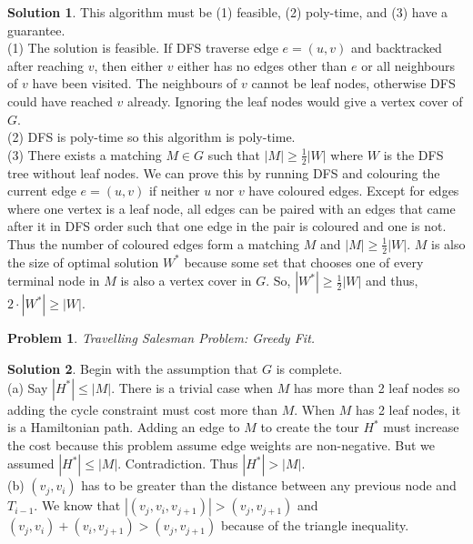 \documentclass{article}
\newtheorem{problem}{Problem}
\theoremstyle{definition}
\newtheorem*{solution}{Solution}
\begin{document}
\begin{solution}

This algorithm must be (1) feasible, (2) poly-time, and (3) have a guarantee. \\

(1) The solution is feasible. If DFS traverse edge \(e=(u,v)\) and backtracked after reaching \(v\), then either \(v\) either has no edges other than \(e\) or all neighbours of \(v\) have been visited. The neighbours of \(v\) cannot be leaf nodes, otherwise DFS could have reached \(v\) already. Ignoring the leaf nodes would give a vertex cover of \(G\). \\

(2) DFS is poly-time so this algorithm is poly-time. \\

(3) There exists a matching \(M\in G\) such that \(|M|\geq \frac{1}{2} |W|\) where \(W\) is the DFS tree without leaf nodes. We can prove this by running DFS and colouring the current edge \(e=(u,v)\) if neither \(u\) nor \(v\) have coloured edges. Except for edges where one vertex is a leaf node, all edges can be paired with an edges that came after it in DFS order such that one edge in the pair is coloured and one is not. Thus the number of coloured edges form a matching \(M\) and \(|M|\geq \frac{1}{2}|W|\). \(M\) is also the size of optimal solution \(W^*\) because some set that chooses one of every terminal node in \(M\) is also a vertex cover in \(G\). So, \(|W^*|\geq \frac{1}{2} |W|\) and thus, \(2\cdot |W^*|\geq |W|\).

\end{solution}

\begin{problem} 

Travelling Salesman Problem: Greedy Fit.

\end{problem}

\begin{solution} Begin with the assumption that \(G\) is complete. \\

(a) Say \(|H^*|\leq |M|\). There is a trivial case when \(M\) has more than 2 leaf nodes so adding the cycle constraint must cost more than \(M\). When \(M\) has 2 leaf nodes, it is a Hamiltonian path. Adding an edge to \(M\) to create the tour \(H^*\) must increase the cost because this problem assume edge weights are non-negative. But we assumed \(|H^*|\leq |M|\). Contradiction. Thus  \(|H^*|>|M|\). \\

(b) \((v_j,v_i)\) has to be greater than the distance between any previous node and \(T_{i-1}\). We know that \(|(v_j,v_i,v_{j+1})|>(v_j,v_{j+1})\) and \((v_j,v_i)+(v_i,v_{j+1})>(v_j,v_{j+1})\) because of the triangle inequality.

\end{solution}
\end{document}
